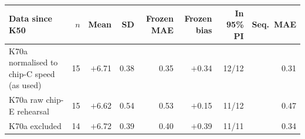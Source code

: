 {\footnotesize
\begin{tabular}{@{}p{4.9cm}rrrrrrr@{}}
\toprule
Data since K50 & $n$ & Mean & SD & Frozen MAE & Frozen bias & In 95\% PI & Seq.\ MAE \\
\midrule
K70a normalised to chip-C speed (as used) & 15 & \ensuremath{+}6.71 & 0.38 & 0.35 & \ensuremath{+}0.34 & 12/12 & 0.31 \\
K70a raw chip-E rehearsal & 15 & \ensuremath{+}6.62 & 0.54 & 0.53 & \ensuremath{+}0.15 & 11/12 & 0.47 \\
K70a excluded & 14 & \ensuremath{+}6.72 & 0.39 & 0.40 & \ensuremath{+}0.39 & 11/11 & 0.34 \\
\bottomrule
\end{tabular}
}
